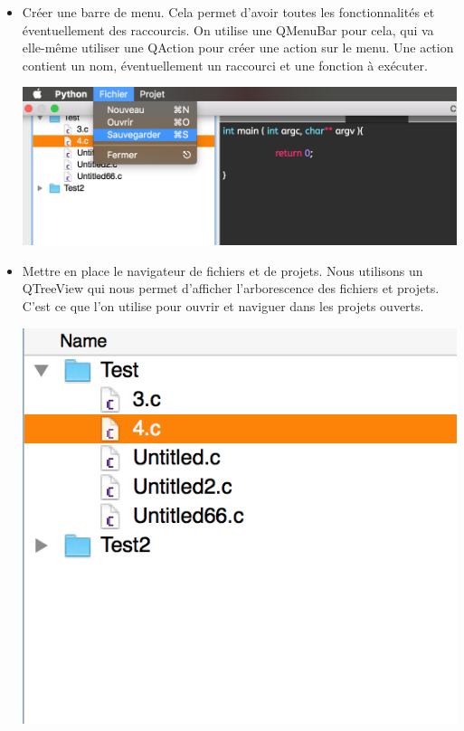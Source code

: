 \documentclass[a4paper,12pt]{article}
\begin{document}
\begin{itemize}
			\item Créer une barre de menu. Cela permet d'avoir toutes les fonctionnalités et éventuellement des raccourcis. On utilise une QMenuBar pour cela, qui va elle-même utiliser une QAction pour créer une action sur le menu. Une action contient un nom, éventuellement un raccourci et une fonction à exécuter. 
			\begin{center}
				\includegraphics[scale=0.6]{images/QMenuBar}
				\vspace{0.5cm}
			\end{center}
			
			\item Mettre en place le navigateur de fichiers et de projets. Nous utilisons un QTreeView qui nous permet d'afficher l'arborescence des fichiers et projets. C'est ce que l'on utilise pour ouvrir et naviguer dans les projets ouverts.\\
			\begin{center}
				\includegraphics[scale=0.6]{images/QTreeView}
				\vspace{0.6cm}
			\end{center}
			

\end{itemize}
\end{document}
